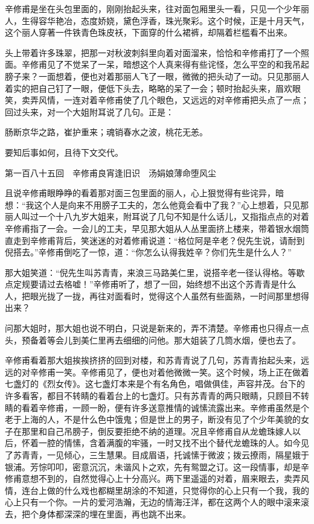 \documentclass[12pt,UTF8]{ctexbook}
\begin{document}
{{{辛修甫是坐在头包里面的，刚刚抬起头来，往对面包厢里头一看，只见一个少年丽人，生得容华艳冶，态度娇娆，黛色浮香，珠光聚彩。这个时候，正是十月天气，这个丽人穿著一件铁青色珠皮袄，下面穿的什么裙裤，却隔着栏槛看不出来。

头上带着许多珠翠，把那一对秋波刺斜里向着对面溜来，恰恰和辛修甫打了一个照面。辛修甫见了不觉呆了一呆，暗想这个人真来得有些诧怪，怎么平空的和我吊起膀子来？一面想着，便也对着那丽人飞了一眼，微微的把头动了一动。只见那丽人着实的把自己钉了一眼，便低下头去，略略的呆了一会；顿时抬起头来，眉欢眼笑，卖弄风情，一连对着辛修甫使了几个眼色，又远远的对辛修甫把头点了一点；回过头来，对一个大姐附耳说了几句。正是：

肠断京华之路，崔护重来；魂销春水之波，桃花无恙。

要知后事如何，且待下文交代。





第一百八十五回　辛修甫良宵逢旧识　汤娟娘薄命堕风尘





且说辛修甫眼睁睁的看着那对面三包里面的丽人，心上狠觉得有些诧异，暗想：“我这个人是向来不用膀子工夫的，怎么他竟会看中了我？”心上想着，只见那丽人叫过一个十八九岁大姐来，附耳说了几句不知是什么话儿，又指指点点的对着辛修甫指了一会。一会儿的工夫，早见那大姐从人丛里面挤上楼来，带着银水烟筒直走到辛修甫背后，笑迷迷的对着修甫说道：“格位阿是辛老？倪先生说，请耐到倪搭去。”辛修甫倒吃了一惊，道：“你怎么认得我姓辛？你们先生是什么人？”

那大姐笑道：“倪先生叫苏青青，来浪三马路美仁里，说搭辛老一径认得格。等歇点定规要请过去格嘘！”辛修甫听了，想了一回，始终想不出这个苏青青是什么人，把眼光拢了一拢，再往对面看时，觉得这个人虽然有些面熟，一时间那里想得出来？

问那大姐时，那大姐也说不明白，只说是新来的，弄不清楚。辛修甫也只得点一点头，预备着等会儿到美仁里再去细细的问他。那大姐装了几筒水烟，便也去了。

辛修甫看着那大姐挨挨挤挤的回到对楼，和苏青青说了几句，苏青青抬起头来，远远的对辛修甫一笑。辛修甫见了，便也对着他微微一笑。这个时候，场上正在做着七盏灯的《烈女传》。这七盏灯本来是个有名角色，唱做俱佳，声容并茂。台下的许多看客，都目不转睛的看着台上的七盏灯。只有苏青青的两只眼睛，只顾目不转睛的看着辛修甫，一顾一盼，便有许多送意推情的诚愫流露出来。辛修甫虽然是个老于上海的人，不是什么色中饿鬼；但是世上的男子，断没有见了个少年美貌的女子在那里和自己吊膀子，倒反要拒绝不纳的道理。况且辛修甫自从龙蟾珠嫁人以后，怀着一腔的情愫，含着满腹的牢骚，一时又找不出个替代龙蟾珠的人。如今见了苏青青，一见倾心，三生慧果。目成眉语，托诚愫于微波；拨云撩雨，隔星娥于银浦。芳悰叩叩，密意沉沉，未谐风卜之欢，先有鸳盟之订。这一段情事，却是辛修甫意想不到的，自然觉得心上十分高兴。两下里遥遥的对着，眉来眼去，卖弄风情，连台上做的什么戏也都糊里胡涂的不知道，只觉得你的心上只有一个我，我的心上只有一个你。一片的爱河浩瀚，无边的情海汪洋，都在这两个人的眼中滚来滚去，把个身体都深深的埋在里面，再也跳不出来。

}}}
\end{document}
